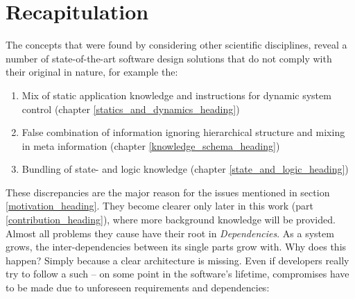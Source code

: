 %
%
%
%
%
%
%

\section{Recapitulation}
\label{recapitulation_heading}

The concepts that were found by considering other scientific disciplines, reveal
a number of state-of-the-art software design solutions that do not comply with
their original in nature, for example the:

\begin{enumerate}
    \item Mix of static application knowledge and instructions for dynamic
        system control (chapter \ref{statics_and_dynamics_heading})
    \item False combination of information ignoring hierarchical structure and
        mixing in meta information (chapter \ref{knowledge_schema_heading})
    \item Bundling of state- and logic knowledge (chapter
        \ref{state_and_logic_heading})
\end{enumerate}

\newpage

These discrepancies are the major reason for the issues mentioned in section
\ref{motivation_heading}. They become clearer only later in this work (part
\ref{contribution_heading}), where more background knowledge will be provided.
Almost all problems they cause have their root in \emph{Dependencies}. As a
system grows, the inter-dependencies between its single parts grow with. Why
does this happen? Simply because a clear architecture is missing. Even if
developers really try to follow a such -- on some point in the software's
lifetime, compromises have to be made due to unforeseen requirements and
dependencies:

